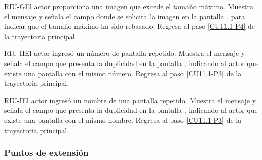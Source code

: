	\begin{UCtrayectoriaA}{RIU-G}{El actor proporciona una imagen que excede el tamaño máximo.}
		\UCpaso[\UCsist] Muestra el mensaje  y señala el campo donde se solicita la imagen en la pantalla , para indicar que el tamaño máximo ha sido rebasado.
		\UCpaso Regresa al paso \ref{CU11.1-P4} de la trayectoria principal.
	\end{UCtrayectoriaA}
	
	\begin{UCtrayectoriaA}{RIU-H}{El actor ingresó un número de pantalla repetido.}
		\UCpaso[\UCsist] Muestra el mensaje  y señala el campo que presenta la duplicidad en la pantalla , indicando al actor que existe una pantalla con el mismo número.
		\UCpaso Regresa al paso \ref{CU11.1-P3} de la trayectoria principal.
	\end{UCtrayectoriaA}

	\begin{UCtrayectoriaA}{RIU-I}{El actor ingresó un nombre de una pantalla repetido.}
		\UCpaso[\UCsist] Muestra el mensaje  y señala el campo que presenta la duplicidad en la pantalla , indicando al actor que existe una pantalla con el mismo nombre.
		\UCpaso Regresa al paso \ref{CU11.1-P3} de la trayectoria principal.
	\end{UCtrayectoriaA}


\subsubsection{Puntos de extensión}

